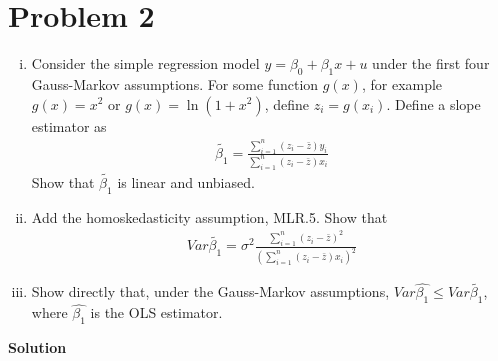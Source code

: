 \documentclass[a4paper]{article}
\begin{document}
\section*{Problem 2}
\begin{enumerate}[(i)]
	\item Consider the simple regression model $y = \beta_0 +\beta_1x+u$ under the first four Gauss-Markov
	assumptions. For some function $g(x)$, for example $g(x) = x^2$ or $g(x) = \ln (1 + x^2)$, define
	$z_i = g(x_i)$. Define a slope estimator as
	\begin{align*}
	\tilde{\beta_1} = \frac{\sum_{i=1}^n (z_i - \bar{z})y_i}{\sum_{i=1}^n (z_i - \bar{z})x_i}
	\end{align*}
	Show that $\tilde{\beta_1}$ is linear and unbiased.
	\item Add the homoskedasticity assumption, MLR.5. Show that
	\begin{align*}
	Var \tilde{\beta_1} = \sigma^2 \frac{\sum_{i=1}^n (z_i -  \bar{z})^2}{\left(\sum_{i=1}^n (z_i - \bar{z})x_i\right)^2}
	\end{align*}
	\item Show directly that, under the Gauss-Markov assumptions, $Var\hat{\beta_1} \le Var\tilde{\beta_1}$, where $\hat{\beta_1}$ is the OLS estimator.
\end{enumerate}



\textbf{Solution}
\end{document}
